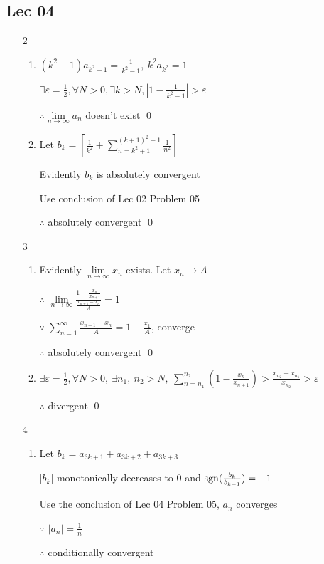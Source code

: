 \subsection{Lec 04}
 \begin{enumerate}[1]
   \item[2]
   \begin{enumerate}[(1)]
     \item
     $(k^2-1)a_{k^2-1}=\frac{1}{k^2-1},\ k^2a_{k^2}=1$
     \par $\exists \varepsilon =\frac{1}{2}, \forall N>0, \exists k>N, \left|1-\frac{1}{k^2-1}\right|>\varepsilon$
     \par $\therefore \lim\limits_{n\rightarrow\infty}a_n$ doesn't exist \qed
     \item
     Let $b_k=\left[\frac{1}{k^2}+\sum\limits_{n=k^2+1}^{(k+1)^2-1}\frac{1}{n^2}\right]$
     \par Evidently $b_k$ is absolutely convergent
     \par Use conclusion of Lec 02 Problem 05
     \par $\therefore$ absolutely convergent \qed
   \end{enumerate}

   \item[3]
   \begin{enumerate}[(1)]
     \item
     Evidently $\lim\limits_{n\rightarrow\infty}x_n$ exists. Let $x_n\rightarrow A$
     \par $\therefore$ $\lim\limits_{n\rightarrow{\infty}}\frac{1-\frac{x_n}{x_{n+1}}}{\frac{x_{n+1}-x_n}{A}}=1$
     \par $\because$ $\sum\limits_{n=1}^\infty\frac{x_{n+1}-x_n}{A}=1-\frac{x_1}{A}$, converge
     \par $\therefore$ absolutely convergent \qed

     \item
     $\exists \varepsilon=\frac{1}{2}, \forall N>0,\  \exists n_1,\ n_2>N,\  \sum\limits_{n=n_1}^{n_2}(1-\frac{x_n}{x_{n+1}})>\frac{x_{n_2}-x_{n_1}}{x_{n_2}}>\varepsilon$
     \par $\therefore$ divergent \qed
   \end{enumerate}

   \item[4]
   \begin{enumerate}[(1)]
     \item
     Let $b_k=a_{3k+1}+a_{3k+2}+a_{3k+3}$
     \par $\left|b_k\right|$ monotonically decreases to $0$ and $\mathop{\mathrm{sgn}} (\frac{b_k}{b_{k-1}})=-1$
     \par Use the conclusion of Lec 04 Problem 05, $a_n$ converges
     \par $\because$ $\left|a_n\right|=\frac{1}{n}$
     \par $\therefore$ conditionally convergent


\end{enumerate}
\end{enumerate}
